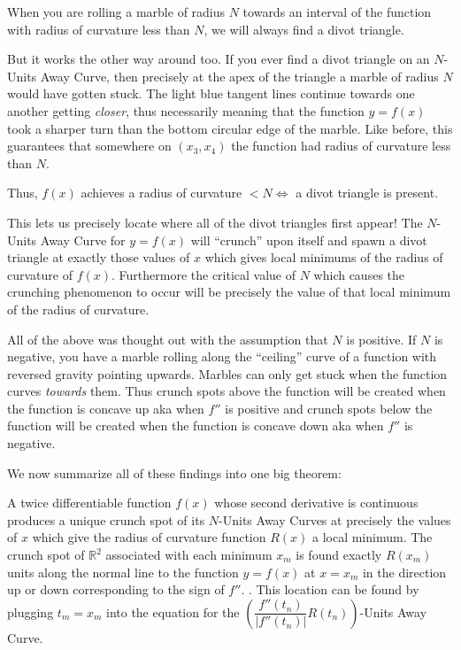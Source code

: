 When you are rolling a marble of radius $N$ towards an interval of the function with radius of curvature less than $N$, we will always find a divot triangle.

But it works the other way around too. If you ever find a divot triangle on an $N$-Units Away Curve, then precisely at the apex of the triangle a marble of radius $N$ would have gotten stuck. The light blue tangent lines continue towards one another getting \textit{closer}, thus necessarily meaning that the function $y = f(x)$ took a sharper turn than the bottom circular edge of the marble. Like before, this guarantees that somewhere on $(x_3, x_4)$ the function had radius of curvature less than $N$.

Thus, $f(x)$ achieves a radius of curvature $ < N \iff $ a divot triangle is present.

This lets us precisely locate where all of the divot triangles first appear! The $N$-Units Away Curve for $y = f(x)$ will ``crunch'' upon itself and spawn a divot triangle at exactly those values of $x$ which gives local minimums of the radius of curvature of $f(x)$. Furthermore the critical value of $N$ which causes the crunching phenomenon to occur will be precisely the value of that local minimum of the radius of curvature.

All of the above was thought out with the assumption that $N$ is positive. If $N$ is negative, you have a marble rolling along the ``ceiling'' curve of a function with reversed gravity pointing upwards. Marbles can only get stuck when the function curves \textit{towards} them. Thus crunch spots above the function will be created when the function is concave up aka when $f''$ is positive and crunch spots below the function will be created when the function is concave down aka when $f''$ is negative.

We now summarize all of these findings into one big theorem:

\begin{myTrm}

    A twice differentiable function $f(x)$ whose second derivative is continuous produces a unique crunch spot of its $N$-Units Away Curves at precisely the values of $x$ which give the radius of curvature function $R(x)$ a local minimum. The crunch spot of $\mathbb{R}^2$ associated with each minimum $x_m$ is found exactly $R(x_m)$ units along the normal line to the function $y=f(x)$ at $x=x_m$ in the direction up or down corresponding to the sign of $f''$. . This location can be found by plugging $t_m = x_m$ into the equation for the $\left( \dfrac{f''(t_n)}{|f''(t_n)|} R(t_n) \right)$-Units Away Curve.

\end{myTrm}

